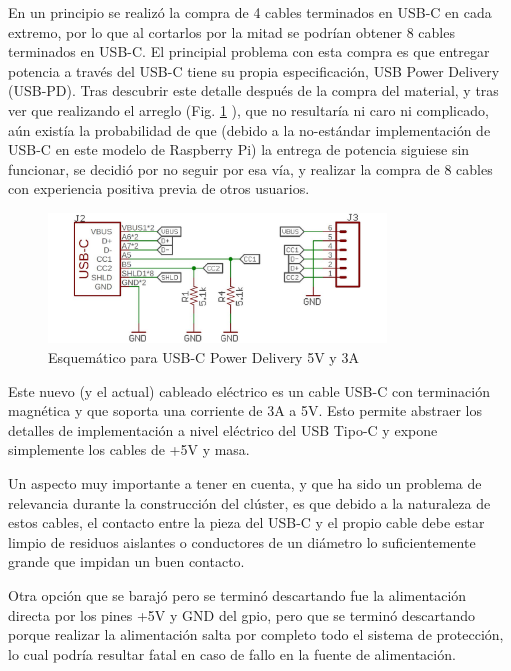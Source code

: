 En un principio se realizó la compra de 4 cables terminados en USB-C en cada extremo, por lo que al cortarlos por la mitad se podrían obtener 8 cables terminados en USB-C. El principial problema con esta compra es que entregar potencia a través del USB-C tiene su propia especificación, USB Power Delivery (USB-PD). Tras descubrir este detalle después de la compra del material, y tras ver que realizando el arreglo (Fig. \ref{fig:usb_pd_schematic} \cite{usb_pd_techforum}), que no resultaría ni caro ni complicado, aún existía la probabilidad de que (debido a la no-estándar implementación de USB-C en este modelo de Raspberry Pi) la entrega de potencia siguiese sin funcionar, se decidió por no seguir por esa vía, y realizar la compra de 8 cables con experiencia positiva previa de otros usuarios.

\begin{figure}[h!]
  \vspace*{0.5cm}
  \centering
  \includegraphics[width=0.8\textwidth]{img/usb_pd_schematic.jpg}
  \caption{Esquemático para USB-C Power Delivery 5V y 3A}
  \label{fig:usb_pd_schematic}
  \vspace*{0.1cm}
\end{figure}

Este nuevo (y el actual) cableado eléctrico es un cable USB-C con terminación magnética y que soporta una corriente de 3A a 5V. Esto permite abstraer los detalles de implementación a nivel eléctrico del USB Tipo-C y expone simplemente los cables de +5V y masa.

Un aspecto muy importante a tener en cuenta, y que ha sido un problema de relevancia durante la construcción del clúster, es que debido a la naturaleza de estos cables, el contacto entre la pieza del USB-C y el propio cable debe estar limpio de residuos aislantes o conductores de un diámetro lo suficientemente grande que impidan un buen contacto.

Otra opción que se barajó pero se terminó descartando fue la alimentación directa por los pines +5V y GND del \acrshort{gpio}, pero que se terminó descartando porque realizar la alimentación salta por completo todo el sistema de protección, lo cual podría resultar fatal en caso de fallo en la fuente de alimentación.

